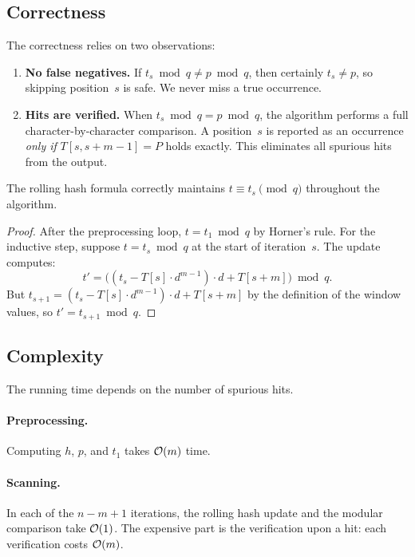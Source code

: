 \subsection{Correctness}

The correctness relies on two observations:
\begin{enumerate}[nosep]
  \item \textbf{No false negatives.}
        If $t_s \bmod q \neq p \bmod q$, then certainly $t_s \neq p$,
        so skipping position~$s$ is safe.
        We never miss a true occurrence.

  \item \textbf{Hits are verified.}
        When $t_s \bmod q = p \bmod q$, the algorithm performs a full
        character-by-character comparison.
        A position~$s$ is reported as an occurrence \emph{only if}
        $T[s, s+m-1] = P$ holds exactly.
        This eliminates all spurious hits from the output.
\end{enumerate}

\begin{formaldetails}
\begin{lemma}
  The rolling hash formula correctly maintains
  $t \equiv t_s \pmod{q}$ throughout the algorithm.
\end{lemma}
\begin{proof}
  After the preprocessing loop, $t = t_1 \bmod q$ by Horner's rule.
  For the inductive step, suppose $t = t_s \bmod q$ at the start of
  iteration~$s$.
  The update computes:
  \[
    t' = \bigl((t_s - T[s]\cdot d^{m-1})\cdot d + T[s+m]\bigr) \bmod q.
  \]
  But $t_{s+1} = (t_s - T[s]\cdot d^{m-1})\cdot d + T[s+m]$ by the
  definition of the window values, so $t' = t_{s+1} \bmod q$.
\end{proof}
\end{formaldetails}

\subsection{Complexity}

The running time depends on the number of spurious hits.

\paragraph{Preprocessing.}
Computing $h$, $p$, and $t_1$ takes $\mathcal{O}\!\left(m\right)$ time.

\paragraph{Scanning.}
In each of the $n - m + 1$ iterations, the rolling hash update and the
modular comparison take $\mathcal{O}\!\left(1\right)$.
The expensive part is the verification upon a hit: each verification
costs $\mathcal{O}\!\left(m\right)$.

